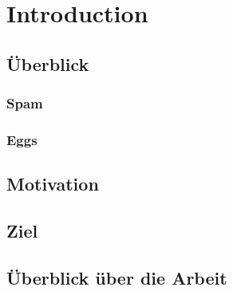 \chapter{Introduction} %

%

    \section{\"Uberblick}
        \subsection{Spam}
        \subsection{Eggs}

    \section{Motivation}

    \section{Ziel}

    \section{\"Uberblick \"uber die Arbeit}